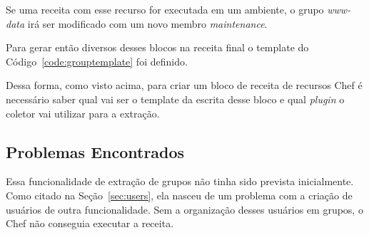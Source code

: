 Se uma receita com esse recurso for executada em um ambiente, o grupo \textit{www-data}
irá ser modificado com um novo membro \textit{maintenance}.

Para gerar então diversos desses blocos na receita final o template do Código~\ref{code:grouptemplate} foi definido.

\noindent\begin{minipage}{\textwidth}
  \lstset{style=shell}
  
\end{minipage}\hfill

Dessa forma, como visto acima, para criar um bloco de receita de recursos Chef é
necessário saber qual vai ser o template da escrita desse bloco e qual \textit{plugin}
o coletor vai utilizar para a extração.

\subsection{Problemas Encontrados}

Essa funcionalidade de extração de grupos não tinha sido prevista inicialmente.
Como citado na Seção~\ref{sec:users}, ela nasceu de um problema com a criação de usuários
de outra funcionalidade. Sem a organização desses usuários em grupos, o Chef não conseguia
executar a receita.

